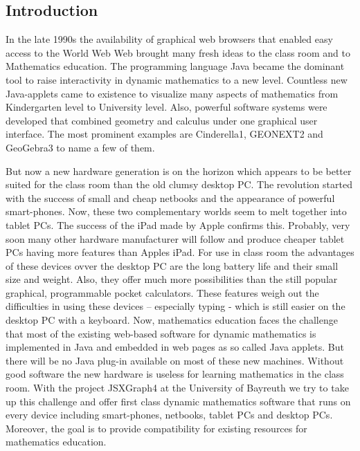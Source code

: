 \documentclass[12pt,a4paper]{article}%
\begin{document}
\subsection{Introduction}
In the late 1990s the availability of graphical web browsers that enabled easy access to the World Web Web brought many fresh ideas to the class room and to Mathematics education. The programming language Java became the dominant tool to raise interactivity in dynamic mathematics to a new level. Countless new Java-applets came to existence to visualize many aspects of mathematics from Kindergarten level to University level. Also, powerful software systems were developed that combined geometry and calculus under one graphical user interface. The most prominent examples are Cinderella1, GEONEXT2 and GeoGebra3 to name a few of them.

But now a new hardware generation is on the horizon which appears to be better suited for the class room than the old clumsy desktop PC. The revolution started with the success of small and cheap netbooks and the appearance of powerful smart-phones. Now, these two complementary worlds seem to melt together into tablet PCs. The success of the iPad made by Apple confirms this. Probably, very soon many other hardware manufacturer will follow and produce cheaper tablet PCs having more features than Apples iPad.
For use in class room the advantages of these devices ovver the desktop PC are the long battery life and their small size and weight. Also, they offer much more possibilities than the still popular graphical, programmable pocket calculators. These features weigh out the difficulties in using these devices – especially typing - which is still easier on the desktop PC with a keyboard.
Now, mathematics education faces the challenge that most of the existing web-based software for dynamic mathematics is implemented in Java and embedded in web pages as so called Java applets.  But there will be no Java plug-in available on most of these new machines. 
Without good software the new hardware is useless for learning mathematics in the class room.
With the project JSXGraph4 at the University of Bayreuth we try to take up this challenge and offer first class dynamic mathematics software that runs on every device including smart-phones, netbooks, tablet PCs and desktop PCs. Moreover, the goal is to provide compatibility for existing resources for mathematics education. 
\end{document}
